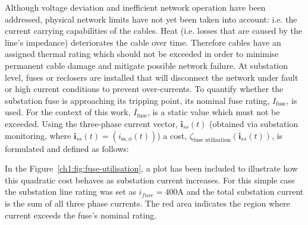 
Although voltage deviation and inefficient network operation have been addressed, physical network limits have not yet been taken into account: i.e. the current carrying capabilities of the cables.
Heat (i.e. losses that are caused by the line's impedance) deteriorates the cable over time.
Therefore cables have an assigned thermal rating which should not be exceeded in order to minimise permanent cable damage and mitigate possible network failure.
At substation level, fuses or reclosers are installed that will disconnect the network under fault or high current conditions to prevent over-currents.
To quantify whether the substation fuse is approaching its tripping point, its nominal fuse rating, $I_\text{fuse}$, is used.
For the context of this work, $I_\text{fuse}$, is a static value which must not be exceeded.
Using the three-phase current vector, $\textbf{i}_{ss}(t)$ (obtained via substation monitoring, where $\textbf{i}_{ss}(t) = (i_{\text{ss},\phi}(t))$) a cost, $\zeta_\text{fuse utilisation}(\textbf{i}_{ss}(t))$, is formulated and defined as follows:



In the Figure~\ref{ch1:fig:fuse-utilisation}, a plot has been included to illustrate how this quadratic cost behaves as substation current increases.
For this simple case the substation line rating was set as $i_{fuse}=400\text{A}$ and the total substation current is the sum of all three phase currents.
The red area indicates the region where current exceeds the fuse's nominal rating.




